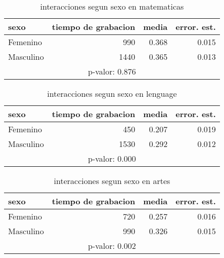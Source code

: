 \documentclass[spanish]{article}
\begin{document}
\begin{table}[h!]
\begin{center}
\begin{tabular}{|l|r|r|r|}
\hline
sexo      & tiempo de grabacion & media          & error. est.    \\ \hline
Femenino  &                 990 &          0.368 &           0.015\\ \hline
Masculino &                1440 &          0.365 &           0.013\\ \hline
\multicolumn{4}{|c|}{p-valor: 0.876} \\ \hline
\end{tabular}
\caption{interacciones segun sexo en matematicas}
\end{center}
\end{table}
\pagebreak
\begin{table}[h!]
\begin{center}
\begin{tabular}{|l|r|r|r|}
\hline
sexo      & tiempo de grabacion & media          & error. est.    \\ \hline
Femenino  &                 450 &          0.207 &           0.019\\ \hline
Masculino &                1530 &          0.292 &           0.012\\ \hline
\multicolumn{4}{|c|}{p-valor: 0.000} \\ \hline
\end{tabular}
\caption{interacciones segun sexo en lenguage}
\end{center}
\end{table}

\begin{table}[h!]
\begin{center}
\begin{tabular}{|l|r|r|r|}
\hline
sexo      & tiempo de grabacion & media          & error. est.    \\ \hline
Femenino  &                 720 &          0.257 &           0.016\\ \hline
Masculino &                 990 &          0.326 &           0.015\\ \hline
\multicolumn{4}{|c|}{p-valor: 0.002} \\ \hline
\end{tabular}
\caption{interacciones segun sexo en artes}
\end{center}
\end{table}
\end{document}
